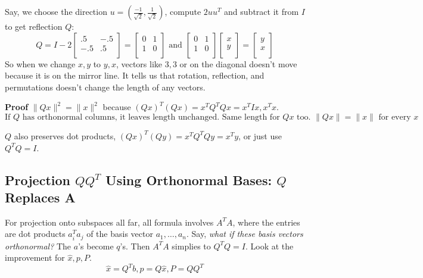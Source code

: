 Say, we choose the direction \(u = (\frac{-1}{\sqrt{2} },\frac{1}{\sqrt{2} })\), compute \(2uu^T\) and subtract it from \(I\) to get reflection \(Q\): 
\[
    Q = I - 2
    \begin{bmatrix}
        .5 & -.5  \\
        -.5 & .5  \\
    \end{bmatrix}
    = 
    \begin{bmatrix}
        0 & 1  \\
        1 & 0  \\
    \end{bmatrix}
    \text{ and }
    \begin{bmatrix}
        0 & 1  \\
        1 & 0  \\
    \end{bmatrix}
    \begin{bmatrix}
         x \\
         y \\
    \end{bmatrix}
    = 
    \begin{bmatrix}
         y \\
         x \\
    \end{bmatrix}
\]    
So when we change \(x, y\) to \(y, x\), vectors like \(3, 3\) or on the diagonal doesn't move because it is on the mirror line. It tells us that rotation, reflection, and permutations doesn't change the length of any vectors. 

\textbf{Proof} \(\lVert Qx \rVert^2 = \lVert x \rVert^2  \) because \((Qx)^T (Qx) = x^T Q^T Qx = x^T Ix, x^T x\). 
\[
    \text{If \(Q\) has orthonormal columns, it leaves length unchanged. Same length for \(Qx\) too. \(\lVert Qx \rVert = \lVert x \rVert\) for every \(x\)   }
\]  

\(Q\) also preserves dot products, \((Qx)^T (Qy)=x^T Q^T Qy = x^T y\), or just use \(Q^T Q = I\).  

\subsection{Projection \(QQ^T\) Using Orthonormal Bases: \(Q\) Replaces A}


For projection onto subspaces all far, all formula involves \(A^T A\), where the entries are dot products \(a^T_i a_j\) of the basis vector \(a_1, \ldots, a_n\). 
Say, \emph{what if these basis vectors orthonormal?} The \(a\)'s become \(q\)'s. Then \(A^T A\) simplies to \(Q^T Q = I\). Look at the improvement for \(\hat{x}, p, P\). 
\[
    \hat{x} = Q^T b, 
    p = Q\hat{x}, 
    P = QQ^T 
\]        

